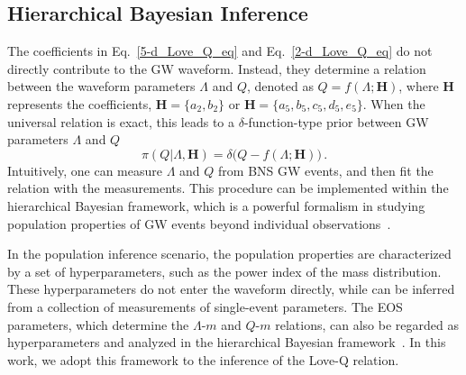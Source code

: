 \documentclass[a4paper,11pt]{article}
\begin{document}
\subsection{Hierarchical Bayesian Inference}
\label{subsec:framework_principles}

The coefficients in Eq.~\eqref{5-d_Love_Q_eq} and Eq.~\eqref{2-d_Love_Q_eq} do
not directly contribute to the GW waveform. Instead, they determine a relation
between the waveform parameters $\Lambda$ and $Q$, denoted as
$Q=f(\Lambda;\bm{H})$, where $\bm{H}$ represents the coefficients, $\bm{H} =
\{a_2, b_2\}$ or $\bm{H} = \{a_5, b_5, c_5, d_5, e_5\}$. When the universal
relation is exact, this leads to a $\delta$-function-type prior between GW
parameters $\Lambda$ and $Q$
\begin{equation}
\label{delta function prior}
\pi(Q|\Lambda,\bm{H}) = \delta\big(Q-f(\Lambda;\bm{H})\big)\,.
\end{equation}
Intuitively, one can measure $\Lambda$ and $Q$ from BNS GW events, and then fit
the relation with the measurements. This procedure can be implemented within the
hierarchical Bayesian framework, which is a powerful formalism in studying population
properties of GW events beyond individual observations~\cite{Thrane_2019}. 

In the population inference scenario, the population properties are
characterized by a set of hyperparameters, such as the power index of the mass
distribution. These hyperparameters do not enter the waveform directly, while
can be inferred from a collection of measurements of single-event parameters.
The EOS parameters, which determine the $\Lambda$-$m$ and $Q$-$m$ relations,
can also be regarded as hyperparameters and analyzed in the hierarchical Bayesian framework~\cite{Mandel:2009nx, Mandel:2009pc,
Adams:2012qw, Lackey:2014fwa, Mandel:2018mve, Golomb:2021tll, KAGRA:2021duu,
Wang:2024xon}. In this work, we adopt this framework to the inference of the
Love-Q relation.
\end{document}
